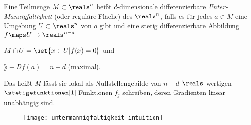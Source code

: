 \begin{definition}\label{untermannigfaltigkeit}
  Eine Teilmenge \( M\subset \reals^n \) heißt \( d \)-dimensionale differenzierbare \emph{Unter-Mannigfaltigkeit} (oder reguläre Fläche) des \( \reals^n \), falls es für jedes \( a\in M \) eine Umgebung \( U\subset \reals^n \) von \( a \) gibt und eine stetig differenzierbare Abbildung \( f\maps U\to \reals^{n-d} \) \sd \begin{eigenschaftenenumerate}
    \item \label{untermannigfaltigkeit:ist_niveaumenge}\( M\cap U=\set{x\in U|f(x)=0} \) und 
    \item \label{untermannigfaltigkeit:maximaler_rang_gibt_dimension} \( \rang-{Df(a)}=n-d \) (maximal).
  \end{eigenschaftenenumerate}
  Das heißt \( M \) lässt sic lokal als Nullstellengebilde von \( n-d \) \( \reals \)-wertigen \( \stetigefunktionen[1] \) Funktionen \( f_j \) schreiben, deren Gradienten linear unabhängig sind.
  \begin{figure}[H]
    \centering
    \texttt{[image: untermannigfaltigkeit\_intuition]}
    \label{fig:untermannigfaltigkeit_intuition}
  \end{figure}
\end{definition}
